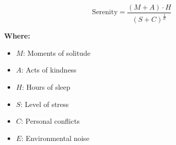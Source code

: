 \begin{equation}
\text{Serenity} = \frac{(M + A) \cdot H}{(S + C)^\frac{1}{E}}
\end{equation}

\textbf{Where:}

\begin{itemize}
    \item $M$: Moments of solitude
    \item $A$: Acts of kindness
    \item $H$: Hours of sleep
    \item $S$: Level of stress
    \item $C$: Personal conflicts
    \item $E$: Environmental noise
\end{itemize}
